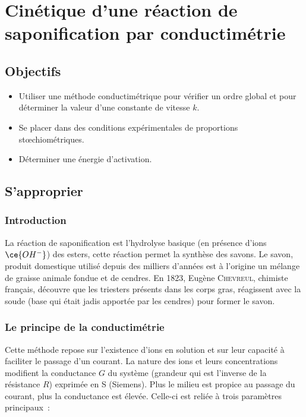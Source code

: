 \documentclass[a4paper, 11pt, final, garamond]{book}
\begin{document}
\setcounter{chapter}{10}

\chapter{Cin\'etique d'une r\'eaction de saponification par conductim\'etrie}
\section{Objectifs}

\begin{itemize}
    \item Utiliser une méthode conductimétrique pour vérifier un ordre global et
        pour déterminer la valeur d'une constante de vitesse $k$.
    \item Se placer dans des conditions expérimentales de proportions
        stœchiométriques.
    \item Déterminer une énergie d'activation. 
\end{itemize}

\section{S'approprier}
\subsection{Introduction}

La réaction de saponification est l'hydrolyse basique (en présence d'ions
$\ce{OH^-}$) des esters, cette réaction permet la synthèse des savons. Le savon,
produit domestique utilisé depuis des milliers d'années est à l'origine un
mélange de graisse animale fondue et de cendres. En 1823, Eugène
\textsc{Chevreul}, chimiste français, découvre que les triesters présents dans
les corps gras, réagissent avec la soude (base qui était jadis apportée par les
cendres) pour former le savon.

\subsection{Le principe de la conductimétrie}

Cette méthode repose sur l'existence d'ions en solution et sur leur capacité à
faciliter le passage d'un courant. La nature des ions et leurs concentrations
modifient la conductance $G$ du système (grandeur qui est l'inverse de la
résistance $R$) exprimée en \si{S} (Siemens). Plus le milieu est propice au
passage du courant, plus la conductance est élevée. Celle-ci est reliée à trois
paramètres principaux~:
\end{document}
